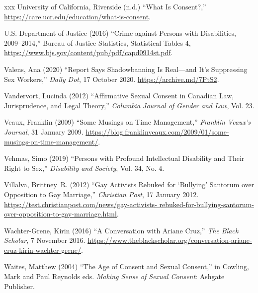 \documentclass[]{jlreq} \usepackage{mystyle}
\begin{document}
\begin{thebibliography}{xxx}
{University of California, Riverside} (n.d.) ``What Is Consent?,''
  \url{https://care.ucr.edu/education/what-is-consent}.

{U.S. Department of Justice} (2016) ``Crime against Persons with Disabilities,
  2009--2014,'' Bureau of Justice Statistics, Statistical Tables 4,
  \url{https://www.bjs.gov/content/pub/pdf/capd0914st.pdf}.

Valens, Ana (2020) ``Report Says Shadowbanning Is Real---and It's Suppressing
  Sex Workers,'' \emph{Daily Dot}, 17 October 2020.
  \url{https://archive.md/7PtS2}.

Vandervort, Lucinda (2012) ``Affirmative Sexual Consent in Canadian Law,
  Jurisprudence, and Legal Theory,'' \textit{ Columbia Journal of Gender and
  Law}, Vol. 23.

Veaux, Franklin (2009) ``Some Musings on Time Management,'' \emph{Franklin
  Veaux’s Journal}, 31 January 2009.
  \url{https://blog.franklinveaux.com/2009/01/some-musings-on-time-management/}.

Vehmas, Simo (2019) ``Persons with Profound Intellectual Disability and Their
  Right to Sex,'' \textit{ Disability and Society}, Vol. 34, No. 4.

Villalva, Brittney~R. (2012) ``Gay Activists Rebuked for `Bullying' Santorum
  over Opposition to Gay Marriage,'' \emph{Christian Post}, 17 January 2012.
  \url{https://test.christianpost.com/news/gay-activists-
  rebuked-for-bullying-santorum-over-opposition-to-gay-marriage.html}.

Wachter-Grene, Kirin (2016) ``A Conversation with Ariane Cruz,'' \emph{The
  Black Scholar}, 7 November 2016.
  \url{https://www.theblackscholar.org/conversation-ariane-cruz-kirin-wachter-grene/}.

Waites, Matthew (2004) ``The Age of Consent and Sexual Consent,'' in Cowling,
  Mark and Paul Reynolds eds.   \textit{ Making Sense of Sexual Consent}:
  Ashgate Publisher.


\end{thebibliography}
\end{document}
